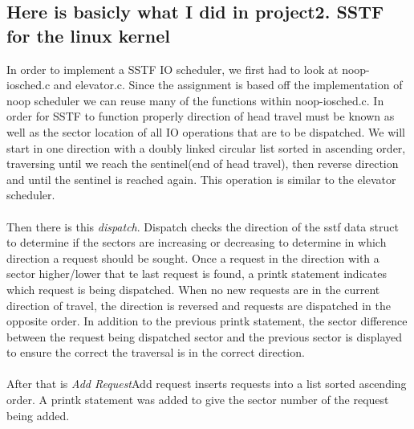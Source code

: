 \documentclass[12pt,letterpaper]{article}
\begin{document}
\subsection{Here is basicly what I did in project2. SSTF for the linux kernel}
\indent In order to implement a SSTF IO scheduler, we first had to look at noop-iosched.c and elevator.c. Since
the assignment is based off the implementation of noop scheduler we can reuse many of the functions within
noop-iosched.c. In order for SSTF to function properly direction of head travel must be known as well as the
sector location of all IO operations that are to be dispatched. We will start in one direction with a doubly
linked circular list sorted in ascending order, traversing until we reach the sentinel(end of head travel), then
reverse direction and until the sentinel is reached again. This operation is similar to the elevator scheduler.\\\\
\indent Then there is this \emph{dispatch}. Dispatch checks the direction of the sstf data struct to determine if the sectors are increasing or decreasing
to determine in which direction a request should be sought. Once a request in the direction with a sector
higher/lower that te last request is found, a printk statement indicates which request is being dispatched.
When no new requests are in the current direction of travel, the direction is reversed and requests are
dispatched in the opposite order. In addition to the previous printk statement, the sector difference between
the request being dispatched sector and the previous sector is displayed to ensure the correct the traversal
is in the correct direction.\\\\
\indent After that is \emph{Add Request}Add request inserts requests into a list sorted ascending order. A printk statement was added to give the
sector number of the request being added.
\end{document}
